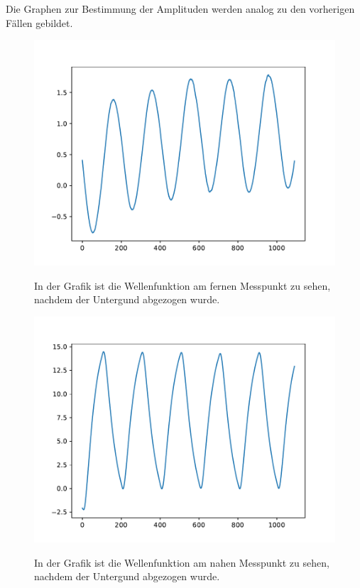 \documentclass[titlepage = firstcover]{scrartcl}
\begin{document}
  Die Graphen zur Bestimmung der Amplituden werden analog zu den vorherigen Fällen gebildet. 

  \begin{figure}[h]
    \centering
    \caption{In der Grafik ist die Wellenfunktion am fernen Messpunkt zu sehen, nachdem der Untergund abgezogen wurde.}
    \includegraphics{AmpStahlFern.pdf}
    \label{fig:AmpStahlFern}
  \end{figure}

  \begin{figure}[h]
    \centering
    \caption{In der Grafik ist die Wellenfunktion am nahen Messpunkt zu sehen, nachdem der Untergund abgezogen wurde.}
    \includegraphics{AmpStahlNah.pdf}
    \label{fig:AmpStahlNah}
  \end{figure}
\end{document}
